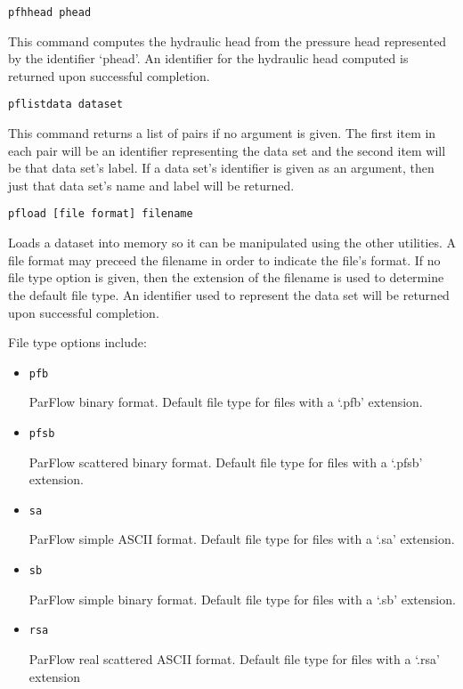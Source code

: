 \begin{description}
\item{\begin{verbatim}pfhhead phead\end{verbatim}}
This command computes the hydraulic head from the pressure head       
represented by the identifier `phead'.  An identifier for the 
hydraulic head computed is returned upon successful completion.

\item{\begin{verbatim}pflistdata dataset\end{verbatim}}
This command returns a list of pairs if no argument is given.  The
first item in each pair will be an identifier representing the data   
set and the second item will be that data set's label.  If a data     
set's identifier is given as an argument, then just that data set's   
name and label will be returned.
       
\item{\begin{verbatim}pfload [file format] filename\end{verbatim}}

Loads a dataset into memory so it can be manipulated using the other
utilities.  A file format may preceed the filename in order to
indicate the file's format.  If no file type option is given, then the
extension of the filename is used to determine the default file type.
An identifier used to represent the data set will be returned upon
successful completion.

      File type options include:
\begin{itemize}
\item{\begin{verbatim}pfb\end{verbatim}} ParFlow binary format.  
Default file type for files with a `.pfb' extension.
\item{\begin{verbatim}pfsb\end{verbatim}}  ParFlow scattered binary format.
Default file type for files with a `.pfsb' extension.
\item{\begin{verbatim}sa\end{verbatim}}  ParFlow simple ASCII format.
Default file type for files with a `.sa' extension.
\item{\begin{verbatim}sb\end{verbatim}} ParFlow simple binary format.
Default file type for files with a `.sb' extension.
\item{\begin{verbatim}rsa\end{verbatim}} ParFlow real scattered ASCII format.
Default file type for files with a `.rsa' extension
\end{itemize}
      

\end{description}

